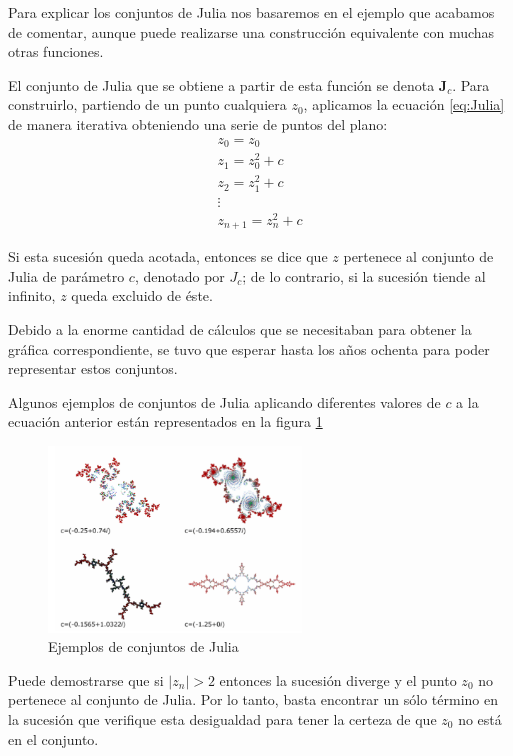 Para explicar los conjuntos de Julia nos basaremos en el ejemplo que acabamos de comentar, aunque puede realizarse una construcción equivalente con muchas otras funciones.

El conjunto de Julia que se obtiene a partir de esta función se denota \textbf{J$_c$}. Para construirlo, partiendo de un punto cualquiera $z_0$, aplicamos la ecuación \ref{eq:Julia} de manera iterativa obteniendo una serie de puntos del plano:
\[\begin{array}{l}
z_0=z_0\\
z_1=z_0^2+c \\
z_2 = z_1^2 + c \\
\vdots \\
z_{n+1} = z_n^2+c
\end{array}\]

Si esta sucesión queda acotada, entonces se dice que $z$ pertenece al conjunto de Julia de parámetro $c$, denotado por $J_c$; de lo contrario, si la sucesión tiende al infinito, $z$ queda excluido de éste.

Debido a la enorme cantidad de cálculos que se necesitaban para obtener la gráfica correspondiente, se tuvo que esperar hasta los años ochenta para poder representar estos conjuntos.

Algunos ejemplos de conjuntos de Julia aplicando diferentes valores de $c$ a la ecuación anterior están representados en la figura \ref{fig:Julia}

\begin{figure}[hbtp]
\centering
\includegraphics[width = 0.6\textwidth]{img/Julia_sets.png}
\caption{Ejemplos de conjuntos de Julia}
\label{fig:Julia}
\end{figure}

Puede demostrarse que si $|z_n| > 2$ entonces la sucesión diverge y el punto $z_0$ no pertenece al conjunto de Julia. Por lo tanto, basta encontrar un sólo término en la sucesión que verifique esta desigualdad para tener la certeza de que $z_0$ no está en el conjunto.

